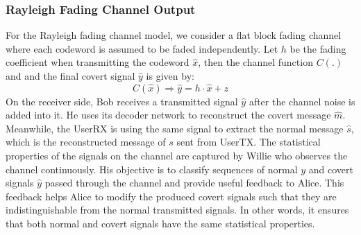 \subsubsection{Rayleigh Fading Channel Output}
For the Rayleigh fading channel model, we consider a flat block fading channel where each codeword is assumed to be faded independently. Let \(h\) be the fading coefficient when transmitting the codeword \(\hat{x}\), then the channel function \(C(.)\) and and the final covert signal \(\hat{y}\) is given by:
\begin{equation}
	C(\hat{x}) \Rightarrow \hat{y} = h \cdot \hat{x} + z
\end{equation}
On the receiver side, Bob receives a transmitted signal \(\hat{y}\) after the channel noise is added into it. He uses its decoder network to reconstruct the covert message \(\hat{m}\). Meanwhile, the UserRX is using the same signal to extract the normal message \(\hat{s}\), which is the reconstructed message of \(s\) sent from UserTX. The statistical properties of the signals on the channel are captured by Willie who observes the channel continuously. His objective is to classify sequences of normal \(y\) and covert signals \(\hat{y}\) passed through the channel and provide useful feedback to Alice. This feedback helps Alice to modify the produced covert signals such that they are indistinguishable from the normal transmitted signals. In other words, it ensures that both normal and covert signals have the same statistical properties.
